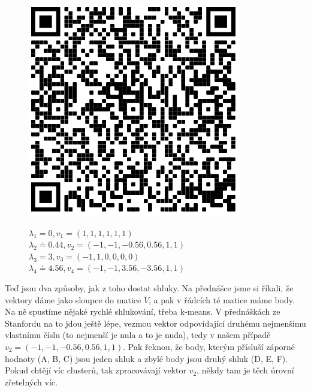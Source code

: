 \documentclass[10pt,a4paper]{article}
\begin{document}
\begin{figure}[H]
\centering
\begin{minipage}{0.15\textwidth}
\centering
\includegraphics[width=\textwidth]{img/spectral-clustering-qr}
\end{minipage} \hfill
\begin{minipage}{0.84\textwidth}

$\lambda_1 = 0, v_1 = (1, 1, 1, 1, 1, 1)$\\
$\lambda_2 \doteq 0.44, v_2 = (-1, -1, -0.56, 0.56, 1, 1)$\\
$\lambda_3 = 3, v_3 = (-1, 1, 0, 0, 0, 0)$\\
$\lambda_4 \doteq 4.56, v_4 = (-1, -1, 3.56, -3.56, 1, 1)$\\


\end{minipage}
\end{figure}

Teď jsou dva způsoby, jak z toho dostat shluky. Na přednášce jsme si říkali, že vektory dáme jako sloupce do matice $V$, a pak v řádcích té matice máme body. Na ně spustíme nějaké rychlé shlukování, třeba k-means. V přednáškách ze Stanfordu na to jdou ještě lépe, vezmou vektor odpovídající druhému nejmenšímu vlastnímu číslu (to nejmenší je nula a to je nuda), tedy v našem případě $v_2 = (-1, -1, -0.56, 0.56, 1, 1)$. Pak řeknou, že body, kterým přísluší záporné hodnoty (A, B, C) jsou jeden shluk a zbylé body jsou druhý shluk (D, E, F). Pokud chtějí víc clusterů, tak zpracovávají vektor $v_2$, někdy tam je těch úrovní zřetelných víc.
\end{document}
